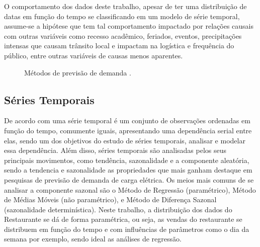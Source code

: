 \documentclass[	12pt, Times, openright, twoside, a4paper, english, brazil]{abntex2}
\begin{document}
          O comportamento dos dados deste trabalho, apesar de ter uma distribuição de datas em função do tempo se classificando em um modelo de série temporal, assume-se a hipótese que tem tal comportamento impactado por relações causais com outras variáveis como recesso acadêmico, feriados, eventos, precipitações intensas que causam trânsito local e impactam na logística e frequência do público, entre outras variáveis de causas menos aparentes.

          \begin{figure}[!ht]
          	\caption{Métodos de previsão de demanda \cite{Junior2007}.\label{fig:metodosPrevisaoDemanda}}
          \end{figure}

        \subsection{Séries Temporais}
          De acordo com  \cite{Morettin1987} uma série temporal é um conjunto de observações ordenadas em função do tempo, comumente iguais, apresentando uma dependência serial entre elas, sendo um dos objetivos do estudo de séries temporais, analisar e modelar essa dependência. Além disso, séries temporais são analisadas pelos seus principais movimentos, como tendência, sazonalidade e a componente aleatória, sendo a tendencia e sazonalidade as propriedades que mais ganham destaque em pesquisas de previsão de demanda de carga elétrica. Os meios mais comuns de se analisar a componente sazonal são o Método de Regressão (paramétrico), Método de Médias Móveis (não paramétrico), e Método de Diferença Sazonal (sazonalidade determinística).  Neste trabalho, a distribuição dos dados do Restaurante se dá de forma paramétrica, ou seja, as vendas do restaurante se distribuem em função do tempo e com influências de parâmetros como o dia da semana por exemplo, sendo ideal as análises de regressão. 
\end{document}
